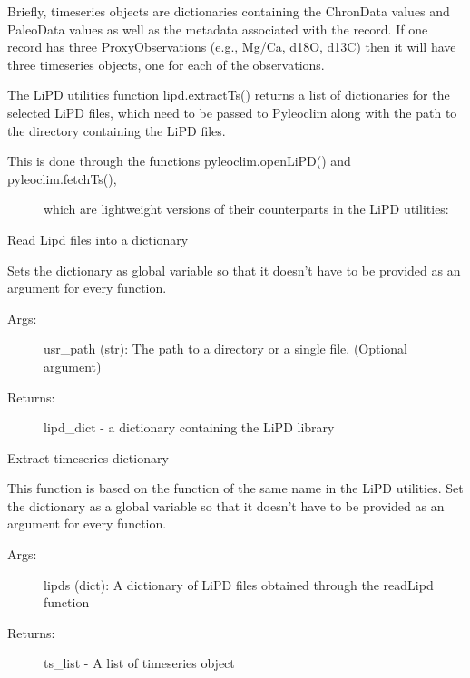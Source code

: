 \documentclass[letterpaper,10pt,english]{sphinxmanual}
\begin{document}
Briefly, timeseries objects are dictionaries containing the ChronData values and
PaleoData values as well as the metadata associated with the record. If one record
has three ProxyObservations (e.g., Mg/Ca, d18O, d13C) then it will have three timeseries
objects, one for each of the observations.

The LiPD utilities function lipd.extractTs() returns a list of dictionaries for
the selected LiPD files, which need to be passed to Pyleoclim along with the path
to the directory containing the LiPD files.
\begin{description}
\item[{This is done through the functions pyleoclim.openLiPD() and pyleoclim.fetchTs(),}] \leavevmode
which are lightweight versions of their counterparts in the LiPD utilities:

\end{description}

\begin{fulllineitems}
\label{\detokenize{Main:pyleoclim.openLipd}}
Read Lipd files into a dictionary

Sets the dictionary as global variable so that it doesn’t have to be provided
as an argument for every function.
\begin{description}
\item[{Args:}] \leavevmode
usr\_path (str): The path to a directory or a single file. (Optional argument)

\item[{Returns:}] \leavevmode
lipd\_dict - a dictionary containing the LiPD library

\end{description}

\end{fulllineitems}


\begin{fulllineitems}
\label{\detokenize{Main:pyleoclim.fetchTs}}
Extract timeseries dictionary

This function is based on the function of the same name in the LiPD utilities.
Set the dictionary as a global variable so that it doesn’t have to be
provided as an argument for every function.
\begin{description}
\item[{Args:}] \leavevmode
lipds (dict): A dictionary of LiPD files obtained through the
readLipd function

\item[{Returns:}] \leavevmode
ts\_list - A list of timeseries object

\end{description}

\end{fulllineitems}
\end{document}
